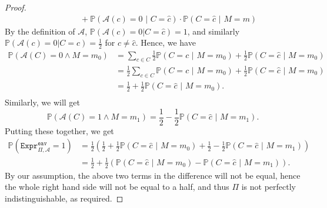 \documentclass{article}
\theoremstyle{definition}
\theoremstyle{example}
\newcommand{\A}{\mathcal{A}}
\newcommand{\Prob}{\mathbb{P}}
\newcommand{\Expr}[2]{\texttt{Expr}^{\texttt{#1}}_{#2}}
\begin{document}
\begin{proof}
\begin{align*}
                                   &\quad\quad\quad + \Prob(\A(c) = 0 \,\,|\,\, C = \hat{c}) \cdot \Prob(C = \hat{c}\,\,|\,\, M = m)
  \end{align*}
  By the definition of $\A$, $ \Prob(\A(c) = 0 | C = \hat{c}) = 1$, and
  similarly $ \Prob(\A(c) = 0 | C = c) = \frac12$ for $c \neq \hat{c}$. Hence,
  we have
  \begin{align*}
    \Prob(\A(C) = 0 \land M = m_0) &= \sum_{c\in C} \frac12 \Prob(C = c\,\,|\,\, M = m_0) + \frac12\Prob(C = \hat{c} \,\, |\,\, M = m_0) \\
                                   &=\frac12 \sum_{c\in C} \Prob(C = c \,\,|\,\, M = m_0) + \frac12\Prob(C = \hat{c} \,\,|\,\, M = m_0) \\
                                   &= \frac12 + \frac12\Prob(C = \hat{c} \,\,|\,\, M = m_0). \\
  \end{align*}
  Similarly, we will get
  \[
    \Prob(\A(C) = 1 \land M = m_1) = \frac12 - \frac12\Prob(C = \hat{c} \,\,|\,\, M = m_1). 
  \]
  Putting these together, we get
  \begin{align*}
    \Prob(\Expr{eav}{\Pi, \A} = 1) & = \frac12 \left( \frac12 + \frac12\Prob(C = \hat{c} \,\,|\,\, M = m_0) + \frac12 - \frac12\Prob(C = \hat{c} \,\,|\,\, M = m_1) \right) \\
                                   &= \frac12 + \frac12 (\Prob(C = \hat{c} \,\,|\,\, M = m_0) - \Prob(C = \hat{c} \,\,|\,\, M = m_1)).
  \end{align*}
  By our assumption, the above two terms in the difference will not be equal,
  hence the whole right hand side will not be equal to a half, and thus $\Pi$ is
  not perfectly indistinguishable, as required.
\end{proof}
\end{document}
